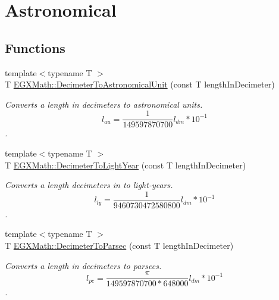 \hypertarget{group___e_g_x_math-_conversions-_length_conversions-_decimeter-_astronomical}{}\section{Astronomical}
\label{group___e_g_x_math-_conversions-_length_conversions-_decimeter-_astronomical}
\subsection*{Functions}
\begin{DoxyCompactItemize}
\item 
{\footnotesize template$<$typename T $>$ }\\T \mbox{\hyperlink{group___e_g_x_math-_conversions-_length_conversions-_decimeter-_astronomical_ga9cf39545f022d3a541668e644347b2f8}{E\+G\+X\+Math\+::\+Decimeter\+To\+Astronomical\+Unit}} (const T length\+In\+Decimeter)
\begin{DoxyCompactList}\small\item\em Converts a length in decimeters to astronomical units. \[ l_{au}= \frac{1}{149597870700} l_{dm} * 10^{-1} \]. \end{DoxyCompactList}\item 
{\footnotesize template$<$typename T $>$ }\\T \mbox{\hyperlink{group___e_g_x_math-_conversions-_length_conversions-_decimeter-_astronomical_ga2dedea5304a0dbcba4efa1128eda42d2}{E\+G\+X\+Math\+::\+Decimeter\+To\+Light\+Year}} (const T length\+In\+Decimeter)
\begin{DoxyCompactList}\small\item\em Converts a length decimeters in to light-\/years. \[ l_{ly}= \frac{1}{9460730472580800} l_{dm} * 10^{-1} \]. \end{DoxyCompactList}\item 
{\footnotesize template$<$typename T $>$ }\\T \mbox{\hyperlink{group___e_g_x_math-_conversions-_length_conversions-_decimeter-_astronomical_gad84954082a6648312ce4fc52d1e4d8eb}{E\+G\+X\+Math\+::\+Decimeter\+To\+Parsec}} (const T length\+In\+Decimeter)
\begin{DoxyCompactList}\small\item\em Converts a length in decimeters to parsecs. \[ l_{pc}=\frac{\pi}{149597870700 * 648000} l_{dm} * 10^{-1} \]. \end{DoxyCompactList}\end{DoxyCompactItemize}


